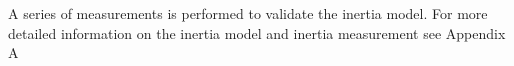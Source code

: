 \noindent A series of measurements is performed to validate the inertia model. For more detailed information on the inertia model and inertia measurement see Appendix A





